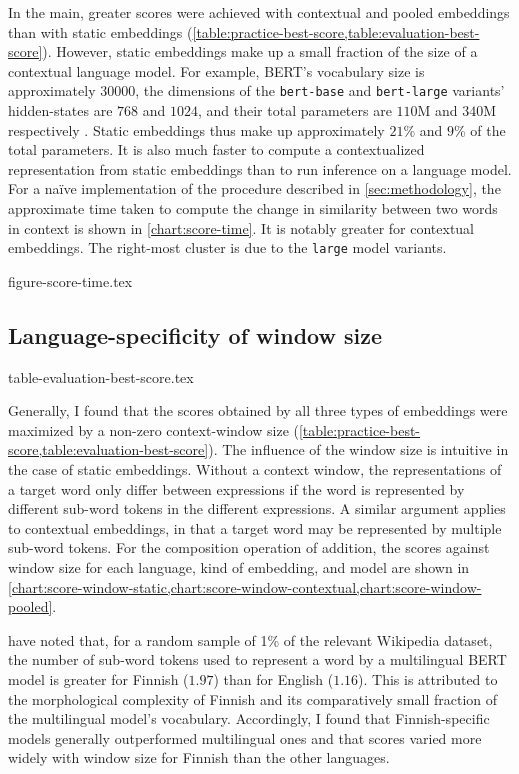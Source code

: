 In the main, greater scores were achieved with contextual and pooled embeddings than
with static embeddings (\cref{table:practice-best-score,table:evaluation-best-score}).
However, static embeddings make up a small fraction of the size of a contextual
language model.
For example, BERT's vocabulary size is approximately $30000$, the dimensions of the
\texttt{bert-base} and \texttt{bert-large} variants' hidden-states are $768$ and
$1024$, and their total parameters are $110$M and $340$M respectively
\parencite[4173-4174]{Devlin2019}.
Static embeddings thus make up approximately $21$\% and $9$\% of the total parameters.
It is also much faster to compute a contextualized representation from static
embeddings than to run inference on a language model.
For a naïve implementation of the procedure described in \cref{sec:methodology}, the
approximate time taken to compute the change in similarity between two words in context
is shown in \cref{chart:score-time}.
It is notably greater for contextual embeddings.
The right-most cluster is due to the \texttt{large} model variants.

{figure-score-time.tex}

\subsection{Language-specificity of window size}
\label{sec:language-specificity}

{table-evaluation-best-score.tex}

Generally, I found that the scores obtained by all three types of embeddings were
maximized by a non-zero context-window size
(\cref{table:practice-best-score,table:evaluation-best-score}).
The influence of the window size is intuitive in the case of static embeddings.
Without a context window, the representations of a target word only differ between
expressions if the word is represented by different sub-word tokens in the different
expressions.
A similar argument applies to contextual embeddings, in that a target word may be
represented by multiple sub-word tokens.
For the composition operation of addition, the scores against window size for each
language, kind of embedding, and model are shown in
\cref{chart:score-window-static,chart:score-window-contextual,chart:score-window-pooled}.

\textcite[3]{Virtanen2019} have noted that, for a random sample of 1\% of the relevant
Wikipedia dataset, the number of sub-word tokens used to represent a word by a
multilingual BERT model is greater for Finnish ($1.97$) than for English ($1.16$).
This is attributed to the morphological complexity of Finnish and its comparatively
small fraction of the multilingual model's vocabulary.
Accordingly, I found that Finnish-specific models generally outperformed multilingual
ones and that scores varied more widely with window size for Finnish than the other
languages.

